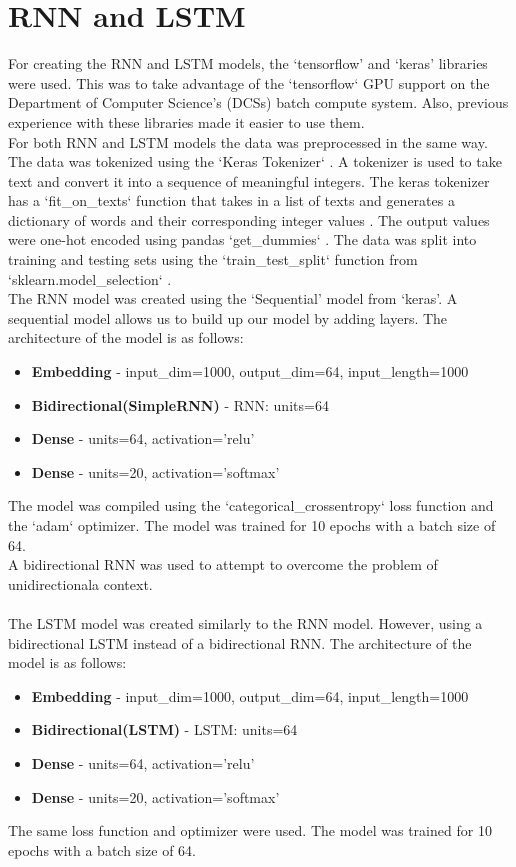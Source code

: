 \section{RNN and LSTM}
For creating the RNN and LSTM models, the `tensorflow' and `keras' libraries were used. This was to take advantage of the `tensorflow` GPU support on
the Department of Computer Science's (DCSs) batch compute system. Also, previous experience with these libraries made it easier to use them.\\
For both RNN and LSTM models the data was preprocessed in the same way. The data was tokenized using the `Keras Tokenizer` \cite{keras-tokenizer}. A tokenizer
is used to take text and convert it into a sequence of meaningful integers. The keras tokenizer has a `fit\_on\_texts` function that takes in a list of texts and
generates a dictionary of words and their corresponding integer values \cite{tftokenizer}. The output values were one-hot encoded using pandas `get\_dummies`
\cite{pandas-dummies}. The data was split into training and testing sets using the `train\_test\_split`
function from `sklearn.model\_selection` \cite{sklearn-split}.\\
The RNN model was created using the `Sequential' model from `keras'. A sequential model allows us to build up our model by adding layers. The architecture of the
model is as follows:
\begin{itemize}
    \item \textbf{Embedding} - input\_dim=1000, output\_dim=64, input\_length=1000
    \item \textbf{Bidirectional(SimpleRNN)} - RNN: units=64
    \item \textbf{Dense} - units=64, activation='relu'
    \item \textbf{Dense} - units=20, activation='softmax'
\end{itemize}
The model was compiled using the `categorical\_crossentropy` loss function and the `adam` optimizer. The model was trained for 10 epochs with a batch size of 64.\\
A bidirectional RNN was used to attempt to overcome the problem of unidirectionala context.\\\\
The LSTM model was created similarly to the RNN model. However, using a bidirectional LSTM instead of a bidirectional RNN. The architecture of the model is as follows:
\begin{itemize}
    \item \textbf{Embedding} - input\_dim=1000, output\_dim=64, input\_length=1000
    \item \textbf{Bidirectional(LSTM)} - LSTM: units=64
    \item \textbf{Dense} - units=64, activation='relu'
    \item \textbf{Dense} - units=20, activation='softmax'
\end{itemize}
The same loss function and optimizer were used. The model was trained for 10 epochs with a batch size of 64.
